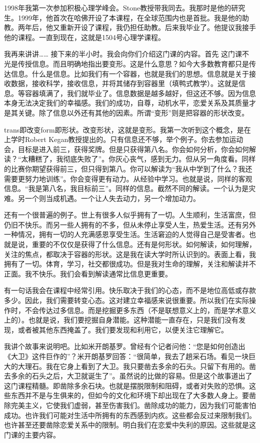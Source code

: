 1998年我第一次参加积极心理学峰会。Stone教授带我同去。我那时是他的研究生。1999年，他首次在哈佛开设了本课程，在全球范围内也是首批。我是他的助教。两年后，他又重新开设了课程，我仍担任助教。后来我毕业了。他提议我接手他的课程。一直到现在，这就是1504号心理学课程。

我再来讲讲…… 接下来的半小时。我会向你们介绍这门课的内容。首先 这门课不光是传授信息。而且明确地指出要变形。这是什么意思？如今大多数教育都只是传达信息。什么是信息。比如我们有一个容器，也就是我们的思想。信息就是关于接收数据，接收科学，接收信息，并将其储存到容器里（填鸭式教学）。这就是信息。等容器填满了，我们就毕业了。信息数据是越多越好，但这还不够。因为信息本身无法决定我们的幸福感。我们的成功，自尊，动机水平，恋爱关系及其质量才是其关键。除了信息以外还有其他的因素。所谓“变形”则是把容器的形状改变。

trans即改变form即形状。改变形状，这就是变形。我第一次听到这个概念，是在上学时Robert Kegan教授提出的。只有信息还不够，举个例子。你去参加运动会，目标是进入前三，获得奖牌。但是只获得第八名。你会如何分析，你会如何解读？“太糟糕了，我彻底失败了”。你灰心丧气，感到无力。但从另一角度看。同样的比赛你期望获得前三，但只得到第八。你可以解读为“我从中学到了什么？我还需要更努力地训练”。你会变得更有动力。从经验中学习。也就是说，同样的客观信息。“我是第八名，我目标前三”。同样的信息。截然不同的解读。一个认为是灾难。另一个则当成机遇。一个让人失去动力，另一个增加动力。

还有一个很普遍的例子。世上有很多人似乎拥有了一切。人生顺利，生活富庶，但仍旧不快乐。而另一些人拥有的不多，但从未停止享受人生，热爱生活。还有另外一种情况，拥有一切的人充满感恩享受生活。生活窘迫的人觉得自己是受害者。也就是说，重要的不仅仅是获得了什么信息。还有是何形状。如何解读，如何理解，关注的焦点，都取决于容器的形状。这是我在读大学时所认识到的。表面上看，我拥有了一切。体育，学习，社交都很成功。但是我对生命的理解，关注和解读并不正面。我不快乐。我们会看到解读通常比信息更重要。

有一句话我会在课程中经常引用。快乐取决于我们的心态，而不是地位高低或存款多少。因此，我们需要转变心态。这对建立幸福感来说很重要。所以我们在实际操作时，不会传达过多信息。而是挖掘更多东西（不是联想意义上的，而是学术意义上的）。也就是说，我们要挖掘自身潜能。这种潜能一直存在，只是我们没有发现，或者被其他东西掩盖了。我们要发现和利用它，以便关注它理解它。

我讲个故事来说明吧。比如米开朗基罗。曾经有个记者问他：“您是如何创造出《大卫》这件巨作的”？米开朗基罗回答：“很简单，我去了趟采石场。看见一块巨大的大理石。我在它身上看到了大卫。我只要凿去多余的石头。只留下有用的。凿去多余的石头之后，大卫就诞生了”。虽然说的比做的容易。但是这个故事道出了这门课程精髓。即凿除多余石块。也就是摆脱限制和阻碍，或者对失败的恐惧。这些东西并不是与生俱来的，但如今的文化和环境下却出现在了大多数人身上。要凿除完美主义，它使我们虚弱，甚至伤害我们。凿除成功的能力，因为我们可能害怕成功。也许我们可能对生活中所拥有的东西感到内疚。这些都会反过来限制我们。也许甚至还要凿除恋爱关系中的限制。明白我们在恋爱中失利的原因。这些就是这门课的主要内容。 

